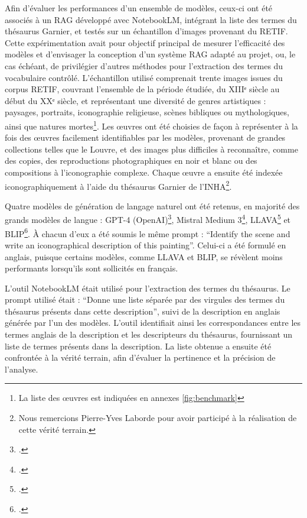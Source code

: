 Afin d’évaluer les performances d’un ensemble de modèles, ceux-ci ont été associés à un RAG développé avec NotebookLM, intégrant la liste des termes du thésaurus Garnier, et testés sur un échantillon d’images provenant du RETIF. Cette expérimentation avait pour objectif principal de mesurer l’efficacité des modèles et d’envisager la conception d’un système RAG adapté au projet, ou, le cas échéant, de privilégier d’autres méthodes pour l’extraction des termes du vocabulaire contrôlé. L’échantillon utilisé comprenait trente images issues du corpus RETIF, couvrant l’ensemble de la période étudiée, du XIIIᵉ siècle au début du XXᵉ siècle, et représentant une diversité de genres artistiques : paysages, portraits, iconographie religieuse, scènes bibliques ou mythologiques, ainsi que natures mortes\footnote{La liste des œuvres est indiquées en annexes \ref{fig:benchmark}}. Les œuvres ont été choisies de façon à représenter à la fois des œuvres facilement identifiables par les modèles, provenant de grandes collections telles que le Louvre, et des images plus difficiles à reconnaître, comme des copies, des reproductions photographiques en noir et blanc ou des compositions à l’iconographie complexe. Chaque œuvre a ensuite été indexée iconographiquement à l’aide du thésaurus Garnier de l’INHA\footnote{Nous remercions Pierre-Yves Laborde pour avoir participé à la réalisation de cette vérité terrain.}.

Quatre modèles de génération de langage naturel ont été retenus, en majorité des grands modèles de langue : GPT-4 (OpenAI)\footcite{openaiGPT4}, Mistral Medium 3\footcite{mistralaiMediumNewLarge}, LLAVA\footcite{liuVisualInstructionTuning2023} et BLIP\footcite{liBLIPBootstrappingLanguageImage2022}. À chacun d’eux a été soumis le même prompt : “Identify the scene and write an iconographical description of this painting”. Celui-ci a été formulé en anglais, puisque certains modèles, comme LLAVA et BLIP, se révèlent moins performants lorsqu’ils sont sollicités en français.

L’outil NotebookLM était utilisé pour l’extraction des termes du thésaurus. Le prompt utilisé était : “Donne une liste séparée par des virgules des termes du thésaurus présents dans cette description”, suivi de la description en anglais générée par l’un des modèles. L’outil identifiait ainsi les correspondances entre les termes anglais de la description et les descripteurs du thésaurus, fournissant un liste de termes présents dans la description. La liste obtenue a ensuite été confrontée à la vérité terrain, afin d’évaluer la pertinence et la précision de l’analyse.

